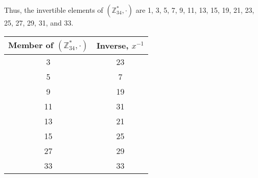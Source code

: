 \documentclass[11pt]{article} %
\begin{document}
Thus, the invertible elements of $\left(\mathbb{Z}_{34}^*, \cdot\right)$ are 1,
3, 5, 7, 9, 11, 13, 15, 19, 21, 23, 25, 27, 29, 31, and 33.
\begin{center}
	\begin{tabular}{c|c}
	Member of $\left(\mathbb{Z}_{34}^*, \cdot\right)$ & Inverse, $x^{-1}$ \\
	\hline
	3 & 23 \\
	5 & 7 \\
	9 & 19 \\
	11 & 31 \\
	13 & 21 \\
	15 & 25 \\
	27 & 29 \\
	33 & 33 \\
	\end{tabular}
\end{center}
\end{document}
